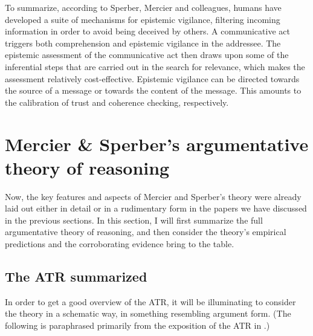 To summarize, according to Sperber, Mercier and colleagues, humans have developed a suite of mechanisms for epistemic vigilance, filtering incoming information in order to avoid being deceived by others. A communicative act triggers both comprehension and epistemic vigilance in the addressee. The epistemic assessment of the communicative act then draws upon some of the inferential steps that are carried out in the search for relevance, which makes the assessment relatively cost-effective. Epistemic vigilance can be directed towards the source of a message or towards the content of the message. This amounts to the calibration of trust and coherence checking, respectively.

\section{Mercier \& Sperber's argumentative theory of reasoning}
\label{sec:MS11}

Now, the key features and aspects of Mercier and Sperber's theory were already laid out either in detail or in a rudimentary form in the papers we have discussed in the previous sections.
In this section, I will first summarize the full argumentative theory of reasoning, and then consider the theory's empirical predictions and the corroborating evidence \citet{MS11} bring to the table.

\subsection{The ATR summarized}

In order to get a good overview of the ATR, it will be illuminating to consider the theory in a schematic way, in something resembling argument form. (The following is paraphrased primarily from the exposition of the ATR in \citealp[p.~60]{MS11}.)

